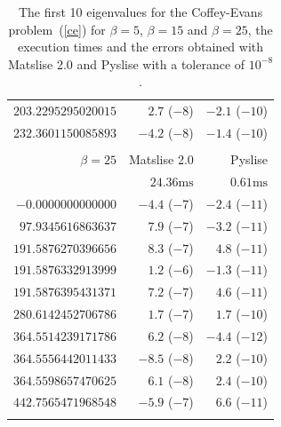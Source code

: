 \begin{table}
\begin{center}
\begin{tabular}[]{rrr}
      $203.2295295020015$ & $2.7$ ($-8$)     & $-2.1$ ($-10$)  \\
      $232.3601150085893$ & $-4.2$ ($-8$)    & $-1.4$ ($-10$)  \\
                          &                  &                 \\
      \bottomrule
      \toprule
      $\beta=25$          & Matslise 2.0     & Pyslise         \\
      \midrule
                          & $24.36\text{ms}$ & $0.61\text{ms}$ \\
      $-0.0000000000000$  & $-4.4$ ($-7$)    & $-2.4$ ($-11$)  \\
      $97.9345616863637$  & $7.9$ ($-7$)     & $-3.2$ ($-11$)  \\
      $191.5876270396656$ & $8.3$ ($-7$)     & $4.8$ ($-11$)   \\
      $191.5876332913999$ & $1.2$ ($-6$)     & $-1.3$ ($-11$)  \\
      $191.5876395431371$ & $7.2$ ($-7$)     & $4.6$ ($-11$)   \\
      $280.6142452706786$ & $1.7$ ($-7$)     & $1.7$ ($-10$)   \\
      $364.5514239171786$ & $6.2$ ($-8$)     & $-4.4$ ($-12$)  \\
      $364.5556442011433$ & $-8.5$ ($-8$)    & $2.2$ ($-10$)   \\
      $364.5598657470625$ & $6.1$ ($-8$)     & $2.4$ ($-10$)   \\
      $442.7565471968548$ & $-5.9$ ($-7$)    & $6.6$ ($-11$)   \\
                          &                  &                 \\
      \bottomrule
    \end{tabular}
  \end{center}
  \caption{\label{tab:c2_tab4}The first 10 eigenvalues for the Coffey-Evans problem~(\ref{ce}) for $\beta=5$, $\beta=15$ and $\beta=25$, the execution times and the errors obtained with Matslise 2.0 and Pyslise with a tolerance of $10^{-8}$.}
\end{table}


